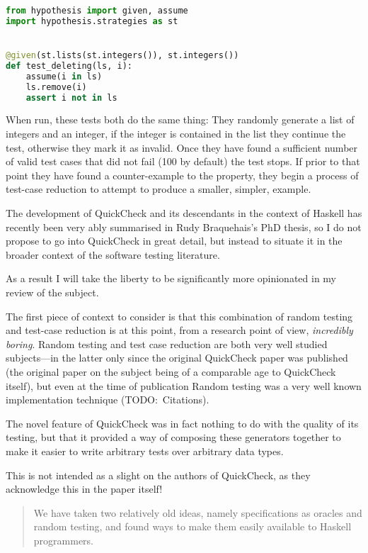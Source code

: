 \begin{lstlisting}[language=Python]
from hypothesis import given, assume
import hypothesis.strategies as st


@given(st.lists(st.integers()), st.integers())
def test_deleting(ls, i):
    assume(i in ls)
    ls.remove(i)
    assert i not in ls
\end{lstlisting}

When run, these tests both do the same thing:
They randomly generate a list of integers and an integer,
if the integer is contained in the list they continue the test,
otherwise they mark it as invalid.
Once they have found a sufficient number of valid test cases that did not fail (100 by default) the test stops.
If prior to that point they have found a counter-example to the property,
they begin a process of test-case reduction to attempt to produce a smaller, simpler, example.

The development of QuickCheck and its descendants in the context of Haskell has recently been very ably summarised in Rudy Braquehais's PhD thesis\cite{matela2017tools},
so I do not propose to go into QuickCheck in great detail,
but instead to situate it in the broader context of the software testing literature.

As a result I will take the liberty to be significantly more opinionated in my review of the subject.

The first piece of context to consider is that this combination of random testing and test-case reduction is at this point,
from a research point of view,
\emph{incredibly boring}.
Random testing and test case reduction are both very well studied subjects---in
the latter only since the original QuickCheck paper was published
(the original paper on the subject being of a comparable age to QuickCheck itself\cite{DBLP:conf/issta/HildebrandtZ00}),
but even at the time of publication Random testing was a very well known implementation technique (TODO:\ Citations).

The novel feature of QuickCheck was in fact nothing to do with the quality of its testing,
but that it provided a way of composing these generators together to make it easier to write arbitrary tests over arbitrary data types.

This is not intended as a slight on the authors of QuickCheck,
as they acknowledge this in the paper itself!

\begin{quote}
We have taken two relatively old ideas, namely specifications as oracles and random testing,
and found ways to make them easily available to Haskell programmers.
\end{quote}

